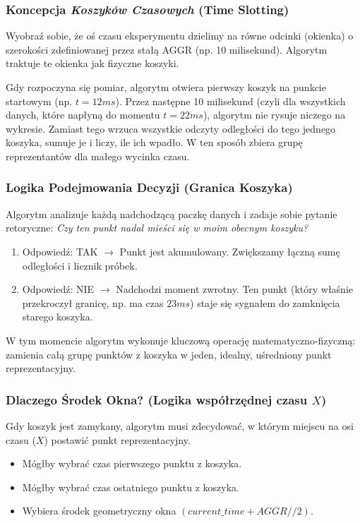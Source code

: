 \documentclass[a4paper,12pt]{article}
\begin{document}
\subsubsection*{Koncepcja \textit{Koszyków Czasowych} (Time Slotting)}
Wyobraź sobie, że oś czasu eksperymentu dzielimy na równe odcinki (okienka) o szerokości zdefiniowanej przez stałą AGGR (np. 10 milisekund). Algorytm traktuje te okienka jak fizyczne koszyki.

\vspace{0.3cm}
\noindent Gdy rozpoczyna się pomiar, algorytm otwiera pierwszy koszyk na punkcie startowym (np. $t = 12{ ms}$).
Przez następne 10 milisekund (czyli dla wszystkich danych, które napłyną do momentu $t = 22{ ms}$), algorytm nie rysuje niczego na wykresie. Zamiast tego wrzuca wszystkie odczyty odległości do tego jednego koszyka, sumuje je i liczy, ile ich wpadło.
W ten sposób zbiera grupę reprezentantów dla małego wycinka czasu.

\subsubsection*{Logika Podejmowania Decyzji (Granica Koszyka)}
Algorytm analizuje każdą nadchodzącą paczkę danych i zadaje sobie pytanie retoryczne: \textit{Czy ten punkt nadal mieści się w moim obecnym koszyku?}

\begin{enumerate}
    \item Odpowiedź: TAK $\rightarrow$ Punkt jest akumulowany. Zwiększamy łączną sumę odległości i licznik próbek.
    \item Odpowiedź: NIE $\rightarrow$ Nadchodzi moment zwrotny. Ten punkt (który właśnie przekroczył granicę, np. ma czas $23{ ms}$) staje się sygnałem do zamknięcia starego koszyka.
\end{enumerate}

\noindent W tym momencie algorytm wykonuje kluczową operację matematyczno-fizyczną: zamienia całą grupę punktów z koszyka w jeden, idealny, uśredniony punkt reprezentacyjny.

\subsubsection*{Dlaczego Środek Okna? (Logika współrzędnej czasu \texorpdfstring{$X$}{X})}
Gdy koszyk jest zamykany, algorytm musi zdecydować, w którym miejscu na osi czasu ($X$) postawić punkt reprezentacyjny.

\begin{itemize}
    \item Mógłby wybrać czas pierwszego punktu z koszyka.
    \item Mógłby wybrać czas ostatniego punktu z koszyka.
    \item Wybiera środek geometryczny okna $(current\_time + AGGR // 2)$.
\end{itemize}
\end{document}
